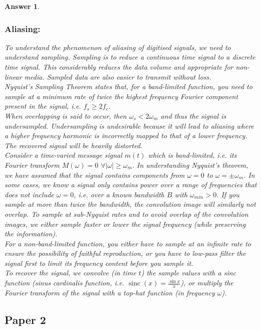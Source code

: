 \documentclass[a4paper]{article}
\DeclareMathOperator{\sinc}{sinc}
\newtheorem{ans}{Answer}[subsection]
\theoremstyle{new}
\begin{document}
\begin{ans}
\newpage
\subsubsection*{Aliasing:}
To understand the phenomenon of aliasing of digitised signals, we need to understand sampling. Sampling is to reduce a continuous time signal to a discrete time signal. This considerably reduces the data volume and appropriate for non-linear media. Sampled data are also easier to transmit without loss.\\[5pt]
Nyquist's Sampling Theorem states that, for a band-limited function, you need to sample at a minimum rate of twice the highest frequency Fourier component present in the signal, i.e. $f_s\geq 2f_c$.\\[5pt]
When overlapping is said to occur, then $\omega_s<2\omega_m$ and thus the signal is undersampled. Undersampling is undesirable because it will lead to aliasing where a higher frequency harmonic is incorrectly mapped to that of a lower frequency. The recovered signal will be heavily distorted.\\[5pt]
Consider a time-varied message signal $m(t)$ which is band-limited, i.e. its Fourier transform $M(\omega)=0$ $\forall|\omega|\geq\omega_m$. In understanding Nyquist's theorem, we have assumed that the signal contains components from $\omega=0$ to $\omega=\pm\omega_m$. In some cases, we know a signal only contains power over a range of frequencies that does not include $\omega=0$, i.e. over a known bandwidth $B$ with $\omega_{min}>0$. If you sample at more than twice the bandwidth, the convolution image will similarly not overlap. To sample at sub-Nyquist rates and to avoid overlap of the convolution images, we either sample faster or lower the signal frequency (while preserving the information).\\[5pt]
For a non-band-limited function, you either have to sample at an infinite rate to ensure the possibility of faithful reproduction, or you have to low-pass filter the signal first to limit its frequency content before you sample it.\\[5pt]
To recover the signal, we convolve (in time $t$) the sample values with a sinc function (sinus cardinalis function, i.e. $\sinc(x)=\frac{\sin x}{x}$), or multiply the Fourier transform of the signal with a top-hat function (in frequency $\omega$).
\end{ans}
\newpage
\subsection{Paper 2}
\end{document}
